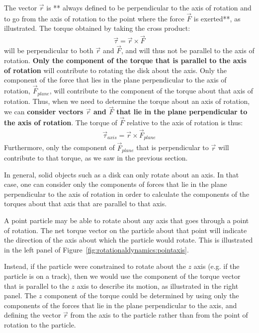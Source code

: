 The vector $\vec r$ is  ** always defined to be perpendicular to the axis of rotation and to go from the axis of rotation to the point where the force $\vec F$ is exerted**, as illustrated. The torque obtained by taking the cross product:
\begin{align*}
\vec \tau = \vec r \times \vec F
\end{align*}
will be perpendicular to both $\vec r$ and $\vec F$, and will thus not be parallel to the axis of rotation. \textbf{Only the component of the torque that is parallel to the axis of rotation} will contribute to rotating the disk about the axis. Only the component of the force that lies in the plane perpendicular to the axis of rotation, $\vec F_{plane}$, will contribute to the component of the torque about that axis of rotation. Thus, when we need to determine the torque about an axis of rotation, we can \textbf{consider vectors $\vec r$ and $\vec F$ that lie in the plane perpendicular to the axis of rotation}. The torque of $\vec F$ relative to the axis of rotation is thus:
\begin{align*}
\vec \tau_{axis} = \vec r \times \vec F_{plane}
\end{align*}
Furthermore, only the component of $\vec F_{plane}$ that is perpendicular to $\vec r$ will contribute to that torque, as we saw in the previous section.

In general, solid objects such as a disk can only rotate about an axis. In that case, one can consider only the components of forces that lie in the plane perpendicular to the axis of rotation in order to calculate the components of the torques about that axis that are parallel to that axis.

A point particle may be able to rotate about any axis that goes through a point of rotation. The net torque vector on the particle about that point will indicate the direction of the axis about which the particle would rotate. This is illustrated in the left panel of Figure~\ref{fig:rotationaldynamics:pointaxis}.

Instead, if the particle were constrained to rotate about the $z$ axis (e.g. if the particle is on a track), then we would use the component of the torque vector that is parallel to the $z$ axis to describe its motion, as illustrated in the right panel. The $z$ component of the torque could be determined by using only the components of the forces that lie in the plane perpendicular to the axis, and defining the vector $\vec r$ from the axis to the particle rather than from the point of rotation to the particle.


